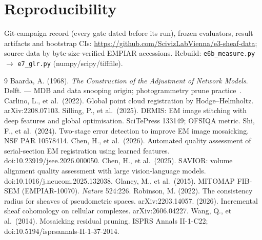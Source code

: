 \documentclass[10pt]{article}
\begin{document}
\section{Reproducibility}
Git-campaign record (every gate dated before its run), frozen evaluators, result artifacts and bootstrap CIs: \url{https://github.com/ScivizLabVienna/e3-sheaf-data}; source data by byte-size-verified EMPIAR accessions. Rebuild: \texttt{e6b\_measure.py} $\rightarrow$ \texttt{e7\_glr.py} (numpy/scipy/tifffile).

\begin{thebibliography}{9}
 Baarda, A. (1968). \emph{The Construction of the Adjustment of Network Models}. Delft. --- MDB and data snooping origin; photogrammetry prune practice~\cite{wang14}.
 Carlino, L., et al.\ (2022). Global point cloud registration by Hodge--Helmholtz. arXiv:2208.07103.
 Silling, P., et al.\ (2025). DEMIS: EM image stitching with deep features and global optimisation. SciTePress 133149; OFSIQA metric.
 Shi, F., et al.\ (2024). Two-stage error detection to improve EM image mosaicking. NSF PAR 10578414.
 Chen, H., et al.\ (2026). Automated quality assessment of serial-section EM registration using learned features. doi:10.23919/jsee.2026.000050.
 Chen, H., et al.\ (2025). SAVIOR: volume alignment quality assessment with large vision-language models. doi:10.1016/j.neucom.2025.132038.
 Glancy, M., et al.\ (2015). MITOMAP FIB-SEM (EMPIAR-10070). \emph{Nature} 524:226.
 Robinson, M. (2022). The consistency radius for sheaves of pseudometric spaces. arXiv:2203.14057.
 (2026). Incremental sheaf cohomology on cellular complexes. arXiv:2606.04227.
 Wang, Q., et al.\ (2014). Mosaicking residual pruning. ISPRS Annals II-1-C22; doi:10.5194/isprsannals-II-1-37-2014.
\end{thebibliography}
\end{document}
